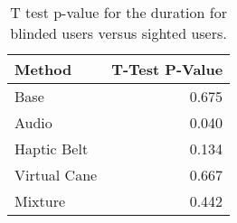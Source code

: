 
\begin{table}[!htb]
\centering
\caption{T test p-value for the duration for blinded users versus sighted users.}
\label{tab:ttest_duration}
\begin{tabular}{lr}
\toprule
      Method &  T-Test P-Value \\
\midrule
        Base &           0.675 \\
       Audio &           0.040 \\
 Haptic Belt &           0.134 \\
Virtual Cane &           0.667 \\
     Mixture &           0.442 \\
\bottomrule
\end{tabular}
\end{table}

